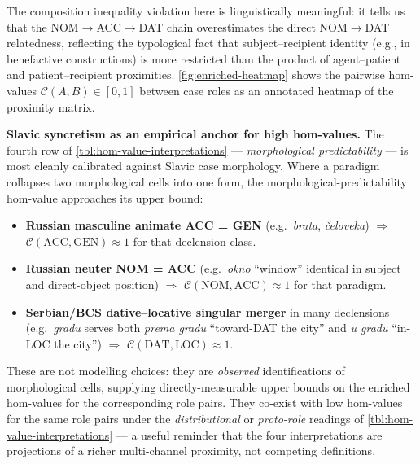 \documentclass[
]{article}
\providecommand{\tightlist}{%
  \setlength{\itemsep}{0pt}\setlength{\parskip}{0pt}}
\begin{document}
The composition inequality violation here is linguistically meaningful:
it tells us that the NOM\texorpdfstring{\ensuremath{\to}}{->}ACC\texorpdfstring{\ensuremath{\to}}{->}DAT chain overestimates the direct NOM\texorpdfstring{\ensuremath{\to}}{->}DAT
relatedness, reflecting the typological fact that subject--recipient
identity (e.g., in benefactive constructions) is more restricted than
the product of agent--patient and patient--recipient proximities.
\autoref{fig:enriched-heatmap} shows the pairwise hom-values
\(\mathcal{C}(A,B) \in [0,1]\) between case roles as an annotated
heatmap of the proximity matrix.

\textbf{Slavic syncretism as an empirical anchor for high hom-values.}
The fourth row of \autoref{tbl:hom-value-interpretations} ---
\emph{morphological predictability} --- is most cleanly calibrated
against Slavic case morphology. Where a paradigm collapses two
morphological cells into one form, the morphological-predictability
hom-value approaches its upper bound:

\begin{itemize}
\tightlist
\item
  \textbf{Russian masculine animate ACC = GEN} (e.g.~\emph{brata},
  \emph{čeloveka}) \texorpdfstring{\ensuremath{\Rightarrow}}{=>} \(\mathcal{C}(\text{ACC}, \text{GEN}) \approx 1\)
  for that declension class.
\item
  \textbf{Russian neuter NOM = ACC} (e.g.~\emph{okno} ``window''
  identical in subject and direct-object position) \texorpdfstring{\ensuremath{\Rightarrow}}{=>}
  \(\mathcal{C}(\text{NOM}, \text{ACC}) \approx 1\) for that paradigm.
\item
  \textbf{Serbian/BCS dative--locative singular merger} in many
  declensions (e.g.~\emph{gradu} serves both \emph{prema gradu}
  ``toward-DAT the city'' and \emph{u gradu} ``in-LOC the city'') \texorpdfstring{\ensuremath{\Rightarrow}}{=>}
  \(\mathcal{C}(\text{DAT}, \text{LOC}) \approx 1\).
\end{itemize}

These are not modelling choices: they are \emph{observed}
identifications of morphological cells, supplying directly-measurable
upper bounds on the enriched hom-values for the corresponding role
pairs. They co-exist with low hom-values for the same role pairs under
the \emph{distributional} or \emph{proto-role} readings of
\autoref{tbl:hom-value-interpretations} --- a useful reminder that the
four interpretations are projections of a richer multi-channel
proximity, not competing definitions.
\end{document}

